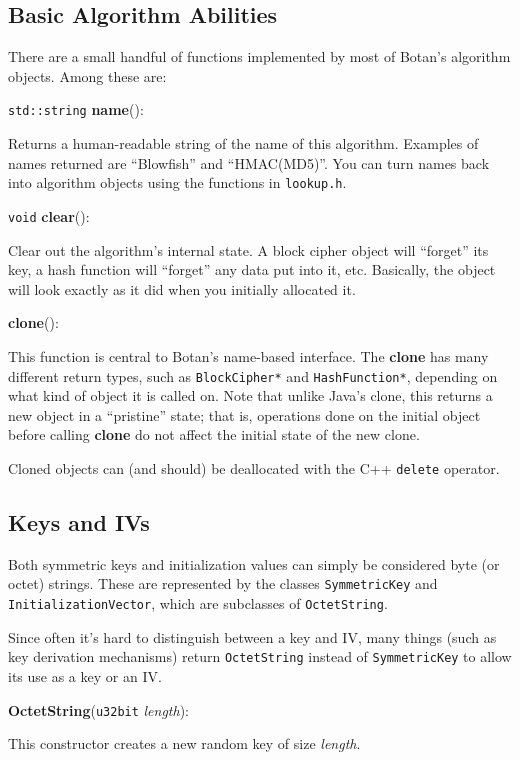 \documentclass{article}
\newcommand{\filename}[1]{\texttt{#1}}
\newcommand{\function}[1]{\textbf{#1}}
\newcommand{\type}[1]{\texttt{#1}}
\renewcommand{\arg}[1]{\textsl{#1}}
\begin{document}
\subsection{Basic Algorithm Abilities}

There are a small handful of functions implemented by most of Botan's
algorithm objects. Among these are:

\noindent
\type{std::string} \function{name}():

Returns a human-readable string of the name of this algorithm. Examples of
names returned are ``Blowfish'' and ``HMAC(MD5)''. You can turn names back into
algorithm objects using the functions in \filename{lookup.h}.

\noindent
\type{void} \function{clear}():

Clear out the algorithm's internal state. A block cipher object will ``forget''
its key, a hash function will ``forget'' any data put into it, etc. Basically,
the object will look exactly as it did when you initially allocated it.

\noindent
\function{clone}():

This function is central to Botan's name-based interface. The \function{clone}
has many different return types, such as \type{BlockCipher*} and
\type{HashFunction*}, depending on what kind of object it is called on. Note
that unlike Java's clone, this returns a new object in a ``pristine'' state;
that is, operations done on the initial object before calling \function{clone}
do not affect the initial state of the new clone.

Cloned objects can (and should) be deallocated with the C++ \texttt{delete}
operator.

\subsection{Keys and IVs}

Both symmetric keys and initialization values can simply be considered byte (or
octet) strings. These are represented by the classes \type{SymmetricKey} and
\type{InitializationVector}, which are subclasses of \type{OctetString}.

Since often it's hard to distinguish between a key and IV, many things (such as
key derivation mechanisms) return \type{OctetString} instead of
\type{SymmetricKey} to allow its use as a key or an IV.

\noindent
\function{OctetString}(\type{u32bit} \arg{length}):

This constructor creates a new random key of size \arg{length}.
\end{document}
